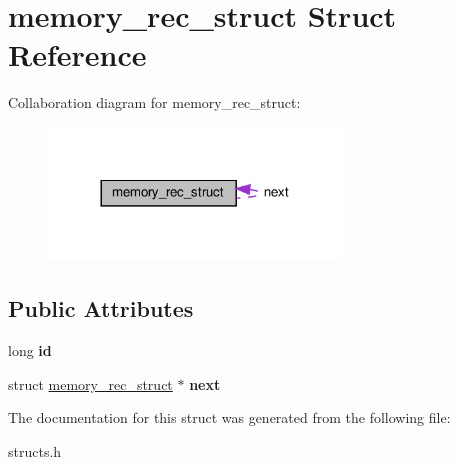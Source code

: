 \hypertarget{structmemory__rec__struct}{}\section{memory\+\_\+rec\+\_\+struct Struct Reference}
\label{structmemory__rec__struct}


Collaboration diagram for memory\+\_\+rec\+\_\+struct\+:\nopagebreak
\begin{figure}[H]
\begin{center}
\leavevmode
\includegraphics[width=221pt]{structmemory__rec__struct__coll__graph}
\end{center}
\end{figure}
\subsection*{Public Attributes}
\begin{DoxyCompactItemize}
\item 
\mbox{\label{structmemory__rec__struct_abf0254762079384254d21eafa993ab4a}} 
long {\bfseries id}
\item 
\mbox{\label{structmemory__rec__struct_a55e8d387dc48a2dd11e4b1c86d7029c8}} 
struct \hyperlink{structmemory__rec__struct}{memory\+\_\+rec\+\_\+struct} $\ast$ {\bfseries next}
\end{DoxyCompactItemize}


The documentation for this struct was generated from the following file\+:\begin{DoxyCompactItemize}
\item 
structs.\+h\end{DoxyCompactItemize}
